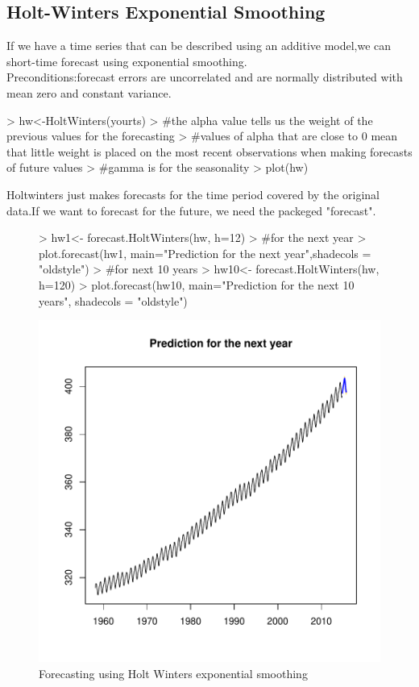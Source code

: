 \documentclass[11pt, a4paper]{article} %
\begin{document}
\subsection{Holt-Winters Exponential Smoothing}%
If we have a time series that can be described using an additive model,we can short-time forecast using exponential smoothing.\\
Preconditions:forecast errors are uncorrelated and are normally distributed with mean zero and constant variance.
\begin{Schunk}
\begin{Sinput}
> hw<-HoltWinters(yourts)
> #the alpha value tells us the weight of the previous values for the forecasting
> #values of alpha that are close to 0 mean that little weight is placed on the most recent observations when making forecasts of future values
> #gamma is for the seasonality
> plot(hw)
\end{Sinput}
\end{Schunk}
\noindent Holtwinters just makes forecasts for the time period covered by the original data.If we want to forecast for the future, we need the packeged "forecast".\\
\begin{figure}[H]
\centering
\begin{Schunk}
\begin{Sinput}
> hw1<- forecast.HoltWinters(hw, h=12)
> #for the next year
> plot.forecast(hw1, main="Prediction for the next year",shadecols = "oldstyle")
> #for next 10 years
> hw10<- forecast.HoltWinters(hw, h=120)
> plot.forecast(hw10, main="Prediction for the next 10 years", shadecols = "oldstyle")
\end{Sinput}
\end{Schunk}
\includegraphics{alles-027}
\caption{Forecasting using Holt Winters exponential smoothing}
\end{figure}
\end{document}
